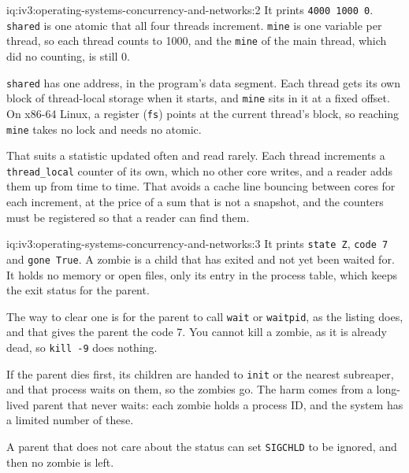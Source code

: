 \begin{solution}{iq:iv3:operating-systems-concurrency-and-networks:2}
It prints \texttt{4000 1000 0}. \texttt{shared} is one atomic that all four threads increment. \texttt{mine} is one variable per thread, so each thread counts to 1000, and the \texttt{mine} of the main thread, which did no counting, is still 0.

\texttt{shared} has one address, in the program's data segment. Each thread gets its own block of thread-local storage when it starts, and \texttt{mine} sits in it at a fixed offset. On x86-64 Linux, a register (\texttt{fs}) points at the current thread's block, so reaching \texttt{mine} takes no lock and needs no atomic.

That suits a statistic updated often and read rarely. Each thread increments a \texttt{thread\_local} counter of its own, which no other core writes, and a reader adds them up from time to time. That avoids a cache line bouncing between cores for each increment, at the price of a sum that is not a snapshot, and the counters must be registered so that a reader can find them.

\end{solution}

\begin{solution}{iq:iv3:operating-systems-concurrency-and-networks:3}
It prints \texttt{state Z}, \texttt{code 7} and \texttt{gone True}. A zombie is a child that has exited and not yet been waited for. It holds no memory or open files, only its entry in the process table, which keeps the exit status for the parent.

The way to clear one is for the parent to call \texttt{wait} or \texttt{waitpid}, as the listing does, and that gives the parent the code 7. You cannot kill a zombie, as it is already dead, so \texttt{kill -9} does nothing.

If the parent dies first, its children are handed to \texttt{init} or the nearest subreaper, and that process waits on them, so the zombies go. The harm comes from a long-lived parent that never waits: each zombie holds a process ID, and the system has a limited number of these.

A parent that does not care about the status can set \texttt{SIGCHLD} to be ignored, and then no zombie is left.

\end{solution}

